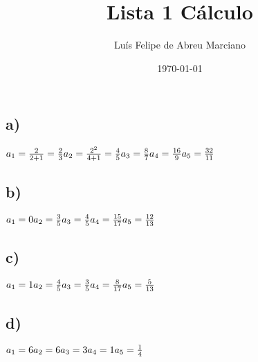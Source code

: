 \documentclass{article}
\title{Lista 1 Cálculo}
\author{Luís Felipe de Abreu Marciano}
\date{\today}
\begin{document}
\maketitle

\newpage

\tableofcontents

\newpage

\section{ }
\subsection*{a)}
$a_1 = \frac{2}{2+1} = \frac{2}{3}\\
a_2 = \frac{2^2}{4+1} = \frac{4}{5}\\
a_3 = \frac{8}{7}\\
a_4 = \frac{16}{9}\\
a_5 = \frac{32}{11}$

\subsection*{b)}
$a_1 = 0\\
a_2 = \frac{3}{5}\\
a_3 = \frac{4}{5}\\
a_4 = \frac{15}{17}\\
a_5 = \frac{12}{13}$

\subsection*{c)}
$a_1 = 1\\
a_2 = \frac{4}{5}\\
a_3 = \frac{3}{5}\\
a_4 = \frac{8}{17}\\
a_5 = \frac{5}{13}$

\subsection*{d)}
$a_1 = 6\\
a_2 = 6\\
a_3 = 3\\
a_4 = 1\\
a_5 = \frac{1}{4}$

\section{}
\end{document}
